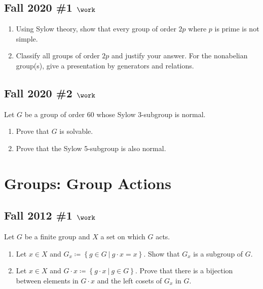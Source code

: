 \hypertarget{fall-2020-1-work}{%
\subsection{\texorpdfstring{Fall 2020 \#1
\(\work\)}{Fall 2020 \#1 \textbackslash work}}\label{fall-2020-1-work}}

\begin{enumerate}
\def\labelenumi{\alph{enumi}.}
\item
  Using Sylow theory, show that every group of order \(2p\) where \(p\)
  is prime is not simple.
\item
  Classify all groups of order \(2p\) and justify your answer. For the
  nonabelian group(s), give a presentation by generators and relations.
\end{enumerate}

\hypertarget{fall-2020-2-work}{%
\subsection{\texorpdfstring{Fall 2020 \#2
\(\work\)}{Fall 2020 \#2 \textbackslash work}}\label{fall-2020-2-work}}

Let \(G\) be a group of order 60 whose Sylow 3-subgroup is normal.

\begin{enumerate}
\def\labelenumi{\alph{enumi}.}
\item
  Prove that \(G\) is solvable.
\item
  Prove that the Sylow 5-subgroup is also normal.
\end{enumerate}

\hypertarget{groups-group-actions}{%
\section{Groups: Group Actions}\label{groups-group-actions}}

\hypertarget{fall-2012-1-work}{%
\subsection{\texorpdfstring{Fall 2012 \#1
\(\work\)}{Fall 2012 \#1 \textbackslash work}}\label{fall-2012-1-work}}

Let \(G\) be a finite group and \(X\) a set on which \(G\) acts.

\begin{enumerate}
\def\labelenumi{\alph{enumi}.}
\item
  Let \(x\in X\) and
  \(G_x \coloneqq\left\{{g\in G {~\mathrel{\Big|}~}g\cdot x = x}\right\}\).
  Show that \(G_x\) is a subgroup of \(G\).
\item
  Let \(x\in X\) and
  \(G\cdot x \coloneqq\left\{{g\cdot x {~\mathrel{\Big|}~}g\in G}\right\}\).
  Prove that there is a bijection between elements in \(G\cdot x\) and
  the left cosets of \(G_x\) in \(G\).
\end{enumerate}


